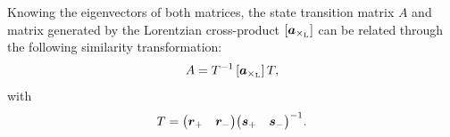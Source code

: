 Knowing the eigenvectors of both matrices, the state transition matrix $A$ and matrix generated by the Lorentzian cross-product $[\vec{a}_{\lorcrossp{}{}}]$ can be related through the following similarity transformation:
$$ A = T^{-1}\,[\vec{a}_{\lorcrossp{}{}}]\,T, $$
with 
$$ T = \mqty(\vec{r}_+ & \vec{r}_-) \mqty(\vec{s}_+ & \vec{s}_-)^{-1}.$$

